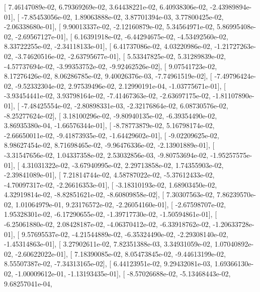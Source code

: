 \documentclass{article}
\begin{document}
       [  7.46147089e-02,   6.79369269e-02,   3.64438221e-02,
          6.40938306e-02,  -2.43989894e-01],
       [ -7.85453056e-02,   1.89063888e-02,   3.87701394e-03,
          3.77800425e-02,  -2.06338680e-01],
       [  9.90013337e-02,  -2.12160879e-02,   5.34564971e-02,
          5.86995408e-02,  -2.69567127e-01],
       [  6.16391918e-02,  -6.44294675e-02,  -4.53492560e-02,
          8.33722255e-02,  -2.34118133e-01],
       [  6.41737086e-02,   4.03220986e-02,  -1.21727263e-02,
         -3.74620516e-02,  -2.63795677e-01],
       [  5.53347825e-02,   5.31289839e-02,  -4.57737694e-02,
         -3.99353752e-02,  -9.92462526e-02],
       [  9.07541723e-02,   8.17276426e-02,   8.06286785e-02,
          9.40026376e-03,  -7.74961519e-02],
       [ -7.49796424e-02,  -9.52332304e-02,   2.97539496e-02,
          2.12990191e-04,  -1.03775671e-01],
       [ -3.93454441e-02,   3.93798164e-02,  -7.41467363e-02,
         -2.63697175e-02,  -1.81107890e-01],
       [ -7.48425554e-02,  -2.80898331e-03,  -2.32176864e-02,
          6.08730576e-02,  -8.25277624e-02],
       [  3.18100296e-02,  -9.80940135e-02,  -6.39354490e-02,
          3.86935380e-04,  -1.66576344e-01],
       [ -8.78773879e-02,   5.16798174e-02,  -2.66650011e-02,
         -9.41873935e-02,  -1.64429602e-01],
       [ -9.02209625e-02,   8.98627454e-02,   8.71698465e-02,
         -9.96476336e-02,  -2.13901889e-01],
       [ -3.31547656e-02,   1.04337358e-02,   2.53032856e-03,
         -9.80753694e-02,  -1.95257575e-01],
       [  4.31031322e-02,  -3.67940995e-02,   2.29713858e-02,
          1.74355903e-02,  -2.39841089e-01],
       [  7.21814744e-02,   4.58787022e-02,  -5.37612433e-02,
         -4.70097317e-02,  -2.26616353e-01],
       [ -3.18310193e-02,   1.68903450e-02,   4.32919814e-02,
         -8.82851621e-02,  -8.60809858e-02],
       [  7.30307563e-02,   7.86239570e-02,   1.01064979e-01,
          9.23176572e-02,  -2.26054160e-01],
       [ -2.67598707e-02,   1.95328301e-02,  -6.17290655e-02,
         -1.39717730e-02,  -1.50594861e-01],
       [ -6.25061880e-02,   2.08428187e-02,  -4.06370412e-02,
         -6.33918762e-02,  -1.20633728e-01],
       [  9.57695537e-02,  -4.21544889e-02,  -6.35324490e-02,
         -2.29308140e-02,  -1.45314863e-01],
       [  3.27902611e-02,   7.82351388e-03,   3.34931059e-02,
          1.07040892e-02,  -2.60622022e-01],
       [  7.18390085e-02,   8.05473845e-02,  -9.44613199e-02,
          8.55507387e-02,  -7.34313165e-02],
       [  6.44123951e-02,   9.29432081e-03,   1.69366130e-02,
         -1.00009612e-01,  -1.13193435e-01],
       [ -8.57026688e-02,  -5.13468443e-02,   9.68257041e-04,
\end{document}
